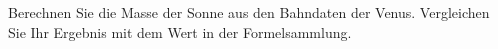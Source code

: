 Berechnen Sie die Masse der Sonne aus den Bahndaten der Venus. Vergleichen Sie Ihr Ergebnis mit dem Wert in der Formelsammlung.
